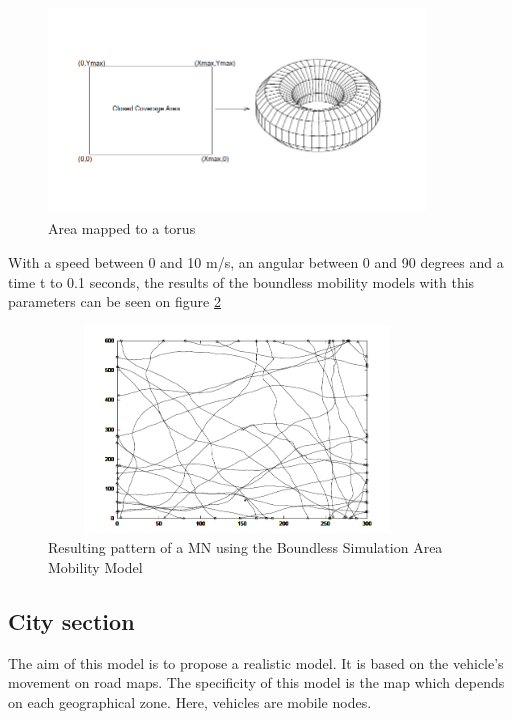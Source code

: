 \begin{figure}[h]
\center
\includegraphics[width=10cm,height=55mm]{../images/boundlessmobilitymodel1.png}
\caption{\label{BoundlessFig}Area mapped to a torus}
\end{figure}


With a speed between 0 and 10 m/s, an angular between 0 and 90 degrees and a time t to 0.1 seconds, the results of the boundless mobility models with this parameters can be seen on figure \ref{BoundlessFig2}\\

\begin{figure}[h]
\center
\includegraphics[width=10cm,height=55mm]{../images/boundlessmobilitymodel2.png}
\caption{\label{BoundlessFig2}Resulting pattern of a MN using the Boundless Simulation Area Mobility Model}
\end{figure}

\newpage

\subsection{City section}

The aim of this model is to propose a realistic model. It is based on the vehicle's movement on road maps. The specificity of this model is the map which depends on each geographical zone. Here, vehicles are mobile nodes.\\

